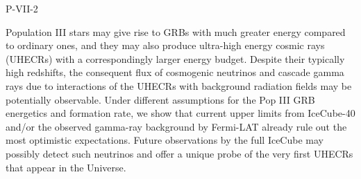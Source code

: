P-VII-2


\bigskip



\bigskip

\noindent Population III stars may give rise to GRBs with much greater energy compared to ordinary ones, and they may also produce ultra-high energy cosmic rays (UHECRs) with a correspondingly larger energy budget. Despite their typically high redshifts, the consequent flux of cosmogenic neutrinos and cascade gamma rays due to interactions of the UHECRs with background radiation fields may be potentially observable. Under different assumptions for the Pop III GRB energetics and formation rate, we show that current upper limits from IceCube-40 and/or the observed gamma-ray background by Fermi-LAT already rule out the most optimistic expectations. Future observations by the full IceCube may possibly detect such neutrinos and offer a unique probe of the very first UHECRs that appear in the Universe.
